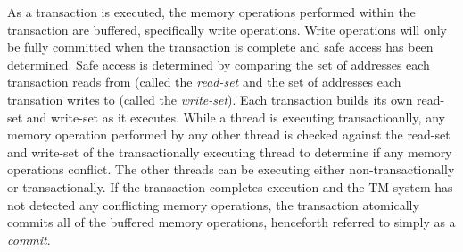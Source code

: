 \documentclass[11pt]{book}
\begin{document}





As a transaction is executed, the memory operations performed within the transaction are
buffered, specifically write operations.  Write operations will only be fully committed
when the transaction is complete and safe access has been determined.  Safe access is
determined by comparing the set of addresses each transaction reads from (called the
\emph{read-set} and the set of addresses each transation writes to (called the
\emph{write-set}).  Each transaction builds its own read-set and write-set as it
executes.  While a thread is executing transactioanlly, any memory operation
performed by any other thread is checked against the read-set and write-set of
the transactionally executing thread to determine if any memory operations
conflict.  The other threads can be executing either non-transactionally or
transactionally.  If the transaction completes execution and the TM system has
not detected any conflicting memory operations, the transaction atomically
commits all of the buffered memory operations, henceforth referred to simply as
a \emph{commit}.
\end{document}
